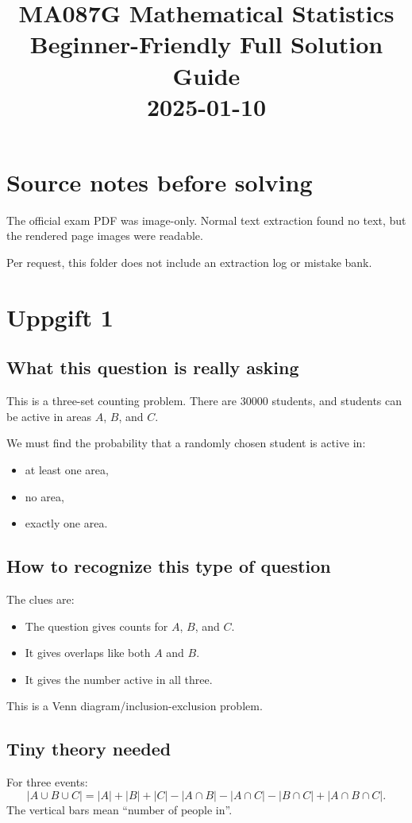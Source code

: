 \documentclass[11pt,a4paper]{article}
\title{MA087G Mathematical Statistics\\Beginner-Friendly Full Solution Guide\\2025-01-10}
\author{}
\date{}
\begin{document}
\maketitle

\section*{Source notes before solving}
The official exam PDF was image-only. Normal text extraction found no text, but the rendered page images were readable.

Per request, this folder does not include an extraction log or mistake bank.

\section*{Uppgift 1}

\subsection*{What this question is really asking}
This is a three-set counting problem. There are 30000 students, and students can be active in areas \(A\), \(B\), and \(C\).

We must find the probability that a randomly chosen student is active in:
\begin{itemize}[leftmargin=*]
    \item at least one area,
    \item no area,
    \item exactly one area.
\end{itemize}

\subsection*{How to recognize this type of question}
The clues are:
\begin{itemize}[leftmargin=*]
    \item The question gives counts for \(A\), \(B\), and \(C\).
    \item It gives overlaps like both \(A\) and \(B\).
    \item It gives the number active in all three.
\end{itemize}
This is a Venn diagram/inclusion-exclusion problem.

\subsection*{Tiny theory needed}
For three events:
\[
|A\cup B\cup C|
=|A|+|B|+|C|-|A\cap B|-|A\cap C|-|B\cap C|+|A\cap B\cap C|.
\]
The vertical bars mean ``number of people in''.
\end{document}
